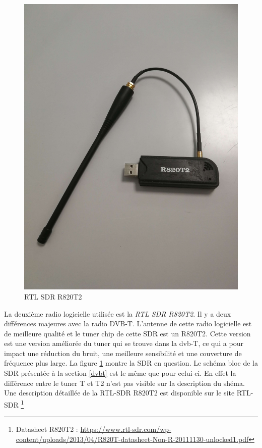 \begin{figure}[h]
\centering

\includegraphics[scale=0.08]{images/r820t2.png}
\caption{RTL SDR R820T2}\label{term32}
\end{figure}

La deuxième radio logicielle utilisée est la \textit{RTL SDR R820T2}. Il y a deux différences majeures avec la radio DVB-T. L'antenne de cette radio logicielle est de meilleure qualité et le tuner chip de cette SDR est un R820T2. Cette version est une version améliorée du tuner qui se trouve dans la dvb-T, ce qui a pour impact une réduction du bruit, une meilleure sensibilité et une couverture de fréquence plus large. La figure \ref{term32} montre la SDR en question. Le schéma bloc de la SDR présentée à la section \ref{dvbt} est le même que pour celui-ci. En effet la différence entre le tuner T et T2 n'est pas visible sur la description du shéma. Une description détaillée de la RTL-SDR R820T2 est disponible sur le site RTL-SDR \footnote{Datasheet R820T2 : \href{https://www.rtl-sdr.com/wp-content/uploads/2013/04/R820T_datasheet-Non_R-20111130_unlocked1.pdf}{https://www.rtl-sdr.com/wp-content/uploads/2013/04/R820T-datasheet-Non-R-20111130-unlocked1.pdf}}


